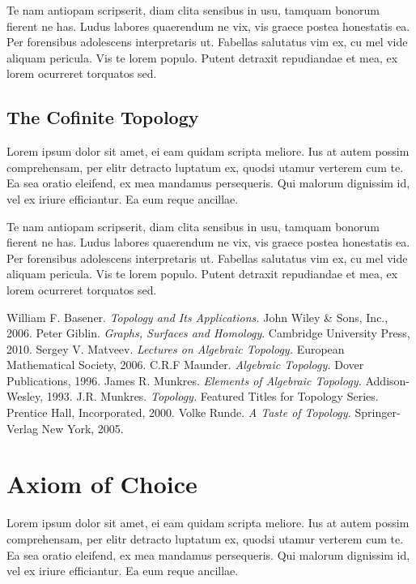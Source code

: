 \documentclass[12pt, a4paper]{article}
\theoremstyle{definition}
\theoremstyle{remark}
\numberwithin{equation}{section}
\numberwithin{figure}{section}
\numberwithin{table}{section}
\begin{document}
            Te nam antiopam scripserit, diam clita sensibus in usu, tamquam bonorum fierent ne has. Ludus labores quaerendum ne vix, vis graece postea honestatis ea. Per forensibus adolescens interpretaris ut. Fabellas salutatus vim ex, cu mel vide aliquam pericula. Vis te lorem populo. Putent detraxit repudiandae et mea, ex lorem ocurreret torquatos sed.
        \subsection{The Cofinite Topology}
            Lorem ipsum dolor sit amet, ei eam quidam scripta meliore. Ius at autem possim comprehensam, per elitr detracto luptatum ex, quodsi utamur verterem cum te. Ea sea oratio eleifend, ex mea mandamus persequeris. Qui malorum dignissim id, vel ex iriure efficiantur. Ea eum reque ancillae.

            Te nam antiopam scripserit, diam clita sensibus in usu, tamquam bonorum fierent ne has. Ludus labores quaerendum ne vix, vis graece postea honestatis ea. Per forensibus adolescens interpretaris ut. Fabellas salutatus vim ex, cu mel vide aliquam pericula. Vis te lorem populo. Putent detraxit repudiandae et mea, ex lorem ocurreret torquatos sed.

    \newpage
    \begin{thebibliography}{100}
         William F. Basener. \emph{Topology and Its Applications.} John Wiley \& Sons, Inc., 2006.
         Peter Giblin. \emph{Graphs, Surfaces and Homology}. Cambridge University Press, 2010.
         Sergey V. Matveev. \emph{Lectures on Algebraic Topology.} European Mathematical Society, 2006.
         C.R.F Maunder. \emph{Algebraic Topology.} Dover Publications, 1996.
         James R. Munkres. \emph{Elements of Algebraic Topology.} Addison-Wesley, 1993.
         J.R. Munkres. \emph{Topology.} Featured Titles for Topology Series. Prentice Hall, Incorporated, 2000.
         Volke Runde. \emph{A Taste of Topology.} Springer-Verlag New York, 2005.
    \end{thebibliography}

    \newpage
    \appendix
    \section{Axiom of Choice}
        Lorem ipsum dolor sit amet, ei eam quidam scripta meliore. Ius at autem possim comprehensam, per elitr detracto luptatum ex, quodsi utamur verterem cum te. Ea sea oratio eleifend, ex mea mandamus persequeris. Qui malorum dignissim id, vel ex iriure efficiantur. Ea eum reque ancillae.
\end{document}
